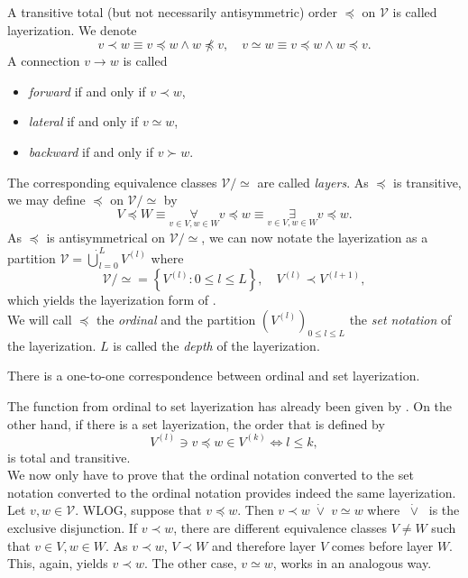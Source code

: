 \documentclass[a4paper,11pt]{report}
\newcommand{\xor}{\;\dot{\vee}\;}
\begin{document}
\begin{Def}[Layerization]\label{def:layerization}
A transitive total (but not necessarily antisymmetric) order $\preceq$ on $\mathcal{V}$ is called layerization. We denote
\[
v\prec w\equiv v\preceq w\wedge w\npreceq v, \quad v\simeq w\equiv v\preceq w\wedge w\preceq v.
\]
A connection $v\to w$ is called
\begin{itemize}
\item
\emph{forward} if and only if $v\prec w$,
\item
\emph{lateral} if and only if $v\simeq w$,
\item
\emph{backward} if and only if $v\succ w$.
\end{itemize}
The corresponding equivalence classes $\mathcal{V}/{\simeq}$ are called \emph{layers}. As $\preceq$ is transitive, we may define $\preceq$ on $\mathcal{V}/{\simeq}$ by
\begin{equation}
V\preceq W\equiv\underset{v\in V, w\in W}{\forall}v\preceq w\equiv\underset{v\in V,w\in W}{\exists}v\preceq w.
\end{equation}
As $\preceq$ is antisymmetrical on $\mathcal{V}/{\simeq}$, we can now notate the layerization as a partition $\mathcal{V}=\dot{\bigcup}_{l=0}^LV^{(l)}$ where
\[
\mathcal{V}/{\simeq}=\left\{V^{(l)}:0\le l\le L\right\},
\quad 
V^{(l)}\prec V^{(l+1)},
\]
which yields the layerization form of .\\
We will call $\preceq$ the \emph{ordinal} and the partition $\left(V^{(l)}\right)_{0\le l\le L}$ the \emph{set notation} of the layerization. $L$ is called the \emph{depth} of the layerization.
\end{Def}

\begin{Pro}\label{pro:layerization-11}
There is a one-to-one correspondence between ordinal and set layerization.
\end{Pro}

\begin{Bew}
The function from ordinal to set layerization has already been given by . On the other hand, if there is a set layerization, the order that is defined by
\[
V^{(l)}\ni v\preceq w\in V^{(k)}\Leftrightarrow l\le k,
\]
is total and transitive.\\
We now only have to prove that the ordinal notation converted to the set notation converted to the ordinal notation provides indeed the same layerization. Let $v,w\in\mathcal{V}$. WLOG, suppose that $v\preceq w$. Then $v\prec w\xor v\simeq w$ where $\xor$ is the exclusive disjunction. If $v\prec w$, there are different equivalence classes $V\ne W$ such that $v\in V,w\in W$. As $v\prec w$, $V\prec W$ and therefore layer $V$ comes before layer $W$. This, again, yields $v\prec w$. The other case, $v\simeq w$, works in an analogous way.
\end{Bew}
\end{document}

